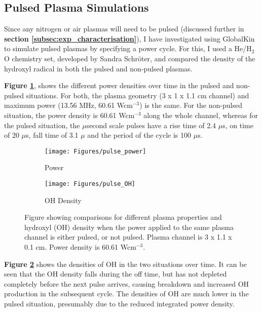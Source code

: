 \documentclass[11pt, oneside]{article}   	%
\begin{document}
\subsection{Pulsed Plasma Simulations}

Since any nitrogen or air plasmas will need to be pulsed (discussed further in \textbf{section \ref{subsec:exp_characterisation}}), I have investigated using GlobalKin to simulate pulsed plasmas by specifying a power cycle.
For this, I used a He/H$_2$O chemistry set, developed by Sandra Schr\"oter, and compared the density of the hydroxyl radical in both the pulsed and non-pulsed plasmas.

\textbf{Figure \ref{subfig:pulsed_power}}, shows the different power densities over time in the pulsed and non-pulsed situations.
For both, the plasma geometry (3 x 1 x 1.1 cm channel) and maximum power (13.56 MHz, 60.61 Wcm$^{-3}$) is the same.
For the non-pulsed situation, the power density is 60.61 Wcm$^{-3}$ along the whole channel, whereas for the pulsed situation, the $\mu$second scale pulses have a rise time of 2.4 $\mu$s, on time of 20 $\mu$s, fall time of 3.1 $\mu$ and the period of the cycle is 100 $\mu$s.

\begin{figure}
\begin{subfigure}{0.5\textwidth}
\texttt{[image: Figures/pulse\_power]}
\caption{Power}
\label{subfig:pulsed_power}
\end{subfigure}
\begin{subfigure}{0.5\textwidth}
\centering
\texttt{[image: Figures/pulse\_OH]}
\caption{OH Density}
\label{subfig:pulsed_OH}
\end{subfigure}
\caption{Figure showing comparisons for different plasma properties and hydroxyl (OH) density when the power applied to the same plasma channel is either pulsed, or not pulsed. Plasma channel is 3 x 1.1 x 0.1 cm. Power density is 60.61 Wcm$^{-3}$.}
\label{fig:pulsing}
\end{figure}

\textbf{Figure \ref{subfig:pulsed_OH}} shows the densities of OH in the two situations over time.
It can be seen that the OH density falls during the off time, but has not depleted completely before the next pulse arrives, causing breakdown and increased OH production in the subsequent cycle.
The densities of OH are much lower in the pulsed situation, presumably due to the reduced integrated power density.
\end{document}
